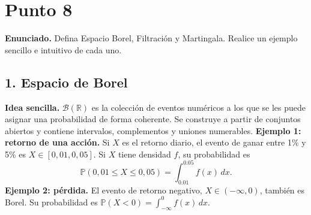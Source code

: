 \documentclass[11pt, a4paper]{article}
\begin{document}
\begin{center}
\end{center}

\newpage

\section*{Punto 8}
\textbf{Enunciado.} Defina Espacio Borel, Filtración y Martingala. Realice un ejemplo sencillo e intuitivo de cada uno.

\subsection*{1. Espacio de Borel}
\textbf{Idea sencilla.} \(\mathcal{B}(\mathbb{R})\) es la colección de eventos numéricos a los que se les puede asignar una probabilidad de forma coherente. Se construye a partir de conjuntos abiertos y contiene intervalos, complementos y uniones numerables.
\textbf{Ejemplo 1: retorno de una acción.} Si \(X\) es el retorno diario, el evento de ganar entre 1\% y 5\% es \(X\in[0{,}01,0{,}05]\). Si \(X\) tiene densidad \(f\), su probabilidad es
\[
\mathbb{P}(0{,}01\le X\le0{,}05)=\int_{0.01}^{0.05}f(x)\,dx.
\]
\textbf{Ejemplo 2: pérdida.} El evento de retorno negativo, \(X\in(-\infty,0)\), también es Borel. Su probabilidad es \(\mathbb{P}(X<0)=\int_{-\infty}^{0}f(x)\,dx\).
\end{document}
